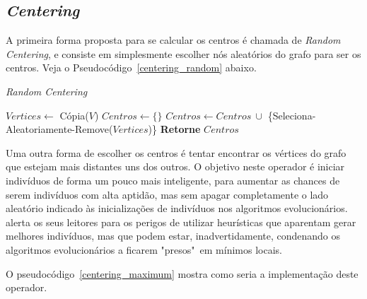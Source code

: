 \subsection{\textit{Centering}}

A primeira forma proposta para se calcular os centros é chamada de 
\textit{Random Centering}, e consiste em simplesmente escolher nós aleatórios do 
grafo para ser os centros. Veja o Pseudocódigo~\ref{centering_random} abaixo.

\begin{algorithm}                  %
	\caption{\textit{Random Centering}}          %
	\label{centering_random}                           %
	\begin{algorithmic}                    %
		\newline
		\State $Vertices \gets $ Cópia($V$)
		\State $Centros \gets \{\}$
			\State $Centros \gets Centros\ \cup$ \{Seleciona-Aleatoriamente-Remove($Vertices$)\}
		\EndFor
		\State \textbf{Retorne} $Centros$
		\EndProcedure
	\end{algorithmic}
\end{algorithm}

Uma outra forma de escolher os centros é tentar encontrar os vértices do grafo 
que estejam mais distantes uns dos outros. O objetivo neste operador é iniciar 
indivíduos de forma um pouco mais inteligente, para aumentar as chances de 
serem indivíduos com alta aptidão, mas sem apagar completamente o lado aleatório 
indicado às inicializações de indivíduos nos algoritmos evolucionários. 
\citep{Luke2013Metaheuristics} alerta os seus leitores para os perigos de 
utilizar heurísticas que aparentam gerar melhores indivíduos, mas que podem 
estar, inadvertidamente, condenando os algoritmos evolucionários a ficarem 
"presos"\ em mínimos locais.

O pseudocódigo~\ref{centering_maximum} mostra como seria a implementação deste 
operador.

